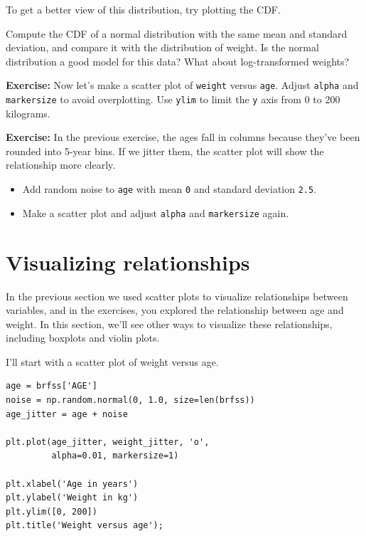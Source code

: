 To get a better view of this distribution, try plotting the CDF.

Compute the CDF of a normal distribution with the same mean and standard
deviation, and compare it with the distribution of weight. Is the normal
distribution a good model for this data? What about log-transformed
weights?

\textbf{Exercise:} Now let's make a scatter plot of
\passthrough{\lstinline!weight!} versus \passthrough{\lstinline!age!}.
Adjust \passthrough{\lstinline!alpha!} and
\passthrough{\lstinline!markersize!} to avoid overplotting. Use
\passthrough{\lstinline!ylim!} to limit the \passthrough{\lstinline!y!}
axis from 0 to 200 kilograms.

\textbf{Exercise:} In the previous exercise, the ages fall in columns
because they've been rounded into 5-year bins. If we jitter them, the
scatter plot will show the relationship more clearly.

\begin{itemize}

\item
  Add random noise to \passthrough{\lstinline!age!} with mean
  \passthrough{\lstinline!0!} and standard deviation
  \passthrough{\lstinline!2.5!}.
\item
  Make a scatter plot and adjust \passthrough{\lstinline!alpha!} and
  \passthrough{\lstinline!markersize!} again.
\end{itemize}

\hypertarget{visualizing-relationships}{%
\section{Visualizing relationships}\label{visualizing-relationships}}

In the previous section we used scatter plots to visualize relationships
between variables, and in the exercises, you explored the relationship
between age and weight. In this section, we'll see other ways to
visualize these relationships, including boxplots and violin plots.

I'll start with a scatter plot of weight versus age.

\begin{lstlisting}[]
age = brfss['AGE']
noise = np.random.normal(0, 1.0, size=len(brfss))
age_jitter = age + noise

plt.plot(age_jitter, weight_jitter, 'o', 
         alpha=0.01, markersize=1)

plt.xlabel('Age in years')
plt.ylabel('Weight in kg')
plt.ylim([0, 200])
plt.title('Weight versus age');
\end{lstlisting}

